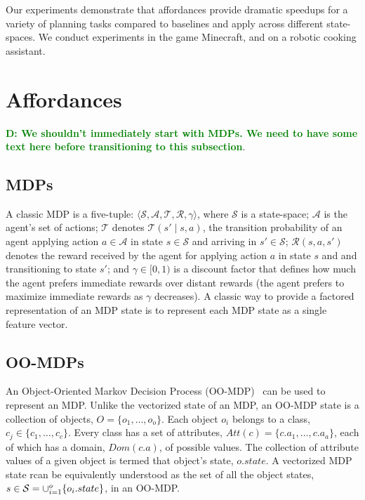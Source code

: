 \documentclass[conference]{IEEEtran}
\newcommand{\dnote}[1]{\textcolor{Green}{\textbf{D: #1}}}
\begin{document}
Our experiments demonstrate that affordances provide dramatic speedups for a variety
of planning tasks compared to baselines and apply across different state-spaces.  We conduct experiments
in the game Minecraft, and on a robotic cooking assistant. 

\section{Affordances}
\label{sec:affordances}

\dnote{We shouldn't immediately start with MDPs. We need to have some text here before transitioning to this subsection}.
\subsection{MDPs}
A classic MDP is a five-tuple: $\langle \mathcal{S}, \mathcal{A}, \mathcal{T},
\mathcal{R}, \gamma \rangle$, where $\mathcal{S}$ is a state-space;
$\mathcal{A}$ is the agent's set of actions; $\mathcal{T}$ denotes
$\mathcal{T}(s' \mid s,a)$, the transition probability of an agent
applying action $a \in \mathcal{A}$ in state $s \in \mathcal{S}$ and
arriving in $s' \in \mathcal{S}$; $\mathcal{R}(s,a,s')$ denotes the
reward received by the agent for applying action $a$ in state $s$ and
and transitioning to state $s'$; and $\gamma \in [0, 1)$ is a discount
  factor that defines how much the agent prefers immediate rewards
  over distant rewards (the agent prefers to maximize
  immediate rewards as $\gamma$ decreases). A classic way to 
  provide a factored representation of an MDP state is to represent
each MDP state as a single feature vector. 

\subsection{OO-MDPs}
An Object-Oriented Markov
Decision Process (OO-MDP)~\citep{diuk08} can be used to represent an MDP. Unlike the vectorized state of an MDP, an OO-MDP state is a collection of objects,
$O = \{o_1, \ldots, o_o \}$.  Each object $o_i$ belongs to a
class, $c_j \in  \{c_1, \ldots, c_c\}$. Every class has a set of attributes,
$Att(c) = \{c.a_1, \ldots, c.a_a \}$, each of which has a domain, $Dom(c.a)$, of possible values. The collection of attribute values of a given object is termed that object's state, $o.state$. A vectorized MDP state rcan be equivalently understood as the set
of all the object states, $s \in {\cal S} = \cup_{i = 1}^o \{o_i.state\}$, in an OO-MDP. 
\end{document}
